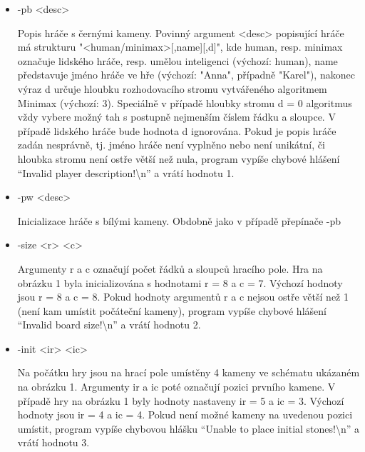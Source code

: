 \documentclass[
12pt,
a4paper,
pdftex,
czech,
titlepage
]{report}
\begin{document}
\begin{itemize}[label={}]
\item -pb <desc>
\hspace{1cm} \begin{minipage}[t]{0.7\textwidth} Popis hráče s černými kameny. Povinný argument <desc> popisující hráče
má strukturu "<human/minimax>[,name][,d]", kde human, resp. minimax
označuje lidského hráče, resp. umělou inteligenci (výchozí: human), name
představuje jméno hráče ve hře (výchozí: "Anna", případně "Karel"), nakonec výraz d určuje hloubku rozhodovacího stromu vytvářeného algoritmem
Minimax (výchozí: 3). Speciálně v případě hloubky stromu d = 0 algoritmus vždy vybere možný tah s postupně nejmenším číslem řádku a sloupce. V případě
lidského hráče bude hodnota d ignorována. Pokud je popis hráče zadán nesprávně, tj. jméno hráče není vyplněno nebo není unikátní, či hloubka
stromu není ostře větší než nula, program vypíše chybové hlášení ``Invalid player description!\textbackslash n'' a vrátí hodnotu 1.
\end{minipage}
\item -pw <desc>
\hspace{1cm} \begin{minipage}[t]{0.7\textwidth} Inicializace hráče s bílými kameny. Obdobně jako v případě přepínače -pb
\end{minipage}
\item -size <r> <c>
\hspace{0.6cm} \begin{minipage}[t]{0.7\textwidth} Argumenty r a c označují počet řádků a sloupců hracího pole. Hra na
obrázku 1 byla inicializována s hodnotami r = 8 a c = 7. Výchozí hodnoty
jsou r = 8 a c = 8. Pokud hodnoty argumentů r a c nejsou ostře větší než
1 (není kam umístit počáteční kameny), program vypíše chybové hlášení
``Invalid board size!\textbackslash n''
a vrátí hodnotu 2.
\end{minipage}
\item -init <ir> <ic>
\hspace{0.8cm} \begin{minipage}[t]{0.7\textwidth}  Na počátku hry jsou na hrací pole umístěny 4 kameny ve schématu ukázaném na obrázku 1. Argumenty ir a ic poté označují pozici prvního kamene. V případě hry na obrázku 1 byly hodnoty nastaveny ir = 5 a ic = 3.
Výchozí hodnoty jsou ir = 4 a ic = 4. Pokud není možné kameny na uvedenou pozici umístit, program vypíše chybovou hlášku ``Unable to place
initial stones!\textbackslash n'' a vrátí hodnotu 3.
\end{minipage}

\end{itemize}
\end{document}
